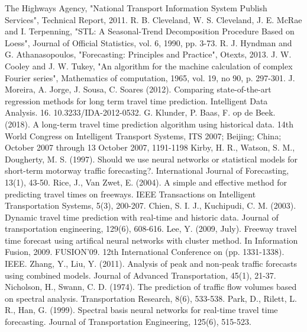 \documentclass[conference, letterpaper]{IEEEtran}
\begin{document}
\begin{thebibliography}{00}
 The Highways Agency, "National Transport Information System Publish Services", Technical Report, 2011. 
 R. B. Cleveland, W. S. Cleveland, J. E. McRae and I. Terpenning, "STL: A Seasonal-Trend Decomposition Procedure Based on Loess", Journal of Official Statistics, vol. 6, 1990, pp. 3-73.
 R. J. Hyndman and G. Athanasopoulos, "Forecasting: Principles and Practice", Otexts, 2013.
 J. W. Cooley and J. W. Tukey, "An algorithm for the machine calculation of complex Fourier series", Mathematics of computation, 1965, vol. 19, no 90, p. 297-301.
 J. Moreira, A. Jorge, J. Sousa, C. Soares (2012). Comparing state-of-the-art regression methods for long term travel time prediction. Intelligent Data Analysis. 16. 10.3233/IDA-2012-0532. 
 G. Klunder, P. Baas, F. op de Beek. (2018). A long-term travel time prediction algorithm using historical data. 14th World Congress on Intelligent Transport Systems, ITS 2007; Beijing; China; October 2007 through 13 October 2007, 1191-1198
 Kirby, H. R., Watson, S. M., Dougherty, M. S. (1997). Should we use neural networks or statistical models for short-term motorway traffic forecasting?. International Journal of Forecasting, 13(1), 43-50.
 Rice, J., Van Zwet, E. (2004). A simple and effective method for predicting travel times on freeways. IEEE Transactions on Intelligent Transportation Systems, 5(3), 200-207.
 Chien, S. I. J., Kuchipudi, C. M. (2003). Dynamic travel time prediction with real-time and historic data. Journal of transportation engineering, 129(6), 608-616.
 Lee, Y. (2009, July). Freeway travel time forecast using artifical neural networks with cluster method. In Information Fusion, 2009. FUSION'09. 12th International Conference on (pp. 1331-1338). IEEE.
 Zhang, Y., Liu, Y. (2011). Analysis of peak and non‐peak traffic forecasts using combined models. Journal of Advanced Transportation, 45(1), 21-37.
 Nicholson, H., Swann, C. D. (1974). The prediction of traffic flow volumes based on spectral analysis. Transportation Research, 8(6), 533-538.
 Park, D., Rilett, L. R., Han, G. (1999). Spectral basis neural networks for real-time travel time forecasting. Journal of Transportation Engineering, 125(6), 515-523.


\end{thebibliography}
\end{document}
